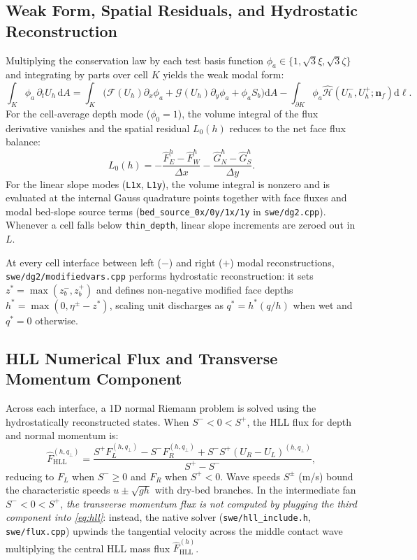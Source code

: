 \documentclass[11pt,a4paper]{article}
\newcommand{\src}[1]{\nolinkurl{#1}}
\newcommand{\dd}{\mathrm d}
\begin{document}
\subsection{Weak Form, Spatial Residuals, and Hydrostatic Reconstruction}
Multiplying the conservation law by each test basis function $\phi_a \in \{1,\sqrt3\xi,\sqrt3\zeta\}$ and integrating by parts over cell $K$ yields the weak modal form:
\begin{equation}
 \int_K \phi_a\,\partial_t U_h\,\dd A =
 \int_K\!\bigl(\mathcal F(U_h)\partial_x\phi_a+\mathcal G(U_h)\partial_y\phi_a+\phi_a S_b\bigr)\dd A
 -\int_{\partial K}\!\phi_a\widehat{\mathcal H}(U_h^-,U_h^+;\boldsymbol n_{\!f})\dd\ell.
 \label{eq:weak}
\end{equation}
For the cell-average depth mode ($\phi_0 = 1$), the volume integral of the flux derivative vanishes and the spatial residual $L_0(h)$ reduces to the net face flux balance:
\begin{equation}
 L_0(h)=-\frac{\widehat{F}^h_E-\widehat{F}^h_W}{\Delta x}
          -\frac{\widehat{G}^h_N-\widehat{G}^h_S}{\Delta y}.\label{eq:mean}
\end{equation}
For the linear slope modes (\texttt{L1x}, \texttt{L1y}), the volume integral is nonzero and is evaluated at the internal Gauss quadrature points together with face fluxes and modal bed-slope source terms (\texttt{bed\_source\_0x/0y/1x/1y} in \src{swe/dg2.cpp}). Whenever a cell falls below \texttt{thin\_depth}, linear slope increments are zeroed out in $L$.

At every cell interface between left ($-$) and right ($+$) modal reconstructions, \src{swe/dg2/modifiedvars.cpp} performs hydrostatic reconstruction: it sets $z^*=\max(z_b^-,z_b^+)$ and defines non-negative modified face depths $h^*=\max(0,\eta^{\pm}-z^*)$, scaling unit discharges as $q^*=h^*(q/h)$ when wet and $q^*=0$ otherwise.

\subsection{HLL Numerical Flux and Transverse Momentum Component}
Across each interface, a 1D normal Riemann problem is solved using the hydrostatically reconstructed states. When $S^-<0<S^+$, the HLL flux for depth and normal momentum is:
\begin{equation}
 \widehat F_{\mathrm{HLL}}^{(h,q_\perp)}=
 \frac{S^+F_L^{(h,q_\perp)}-S^-F_R^{(h,q_\perp)}
       +S^-S^+(U_R-U_L)^{(h,q_\perp)}}{S^+-S^-},\label{eq:hll}
\end{equation}
reducing to $F_L$ when $S^-\geq0$ and $F_R$ when $S^+<0$. Wave speeds $S^{\pm}$ (m/s) bound the characteristic speeds $u\pm\sqrt{gh}$ with dry-bed branches. In the intermediate fan $S^-<0<S^+$, \emph{the transverse momentum flux is not computed by plugging the third component into \eqref{eq:hll}}: instead, the native solver (\src{swe/hll_include.h}, \src{swe/flux.cpp}) upwinds the tangential velocity across the middle contact wave multiplying the central HLL mass flux $\widehat F_{\mathrm{HLL}}^{(h)}$.
\end{document}
